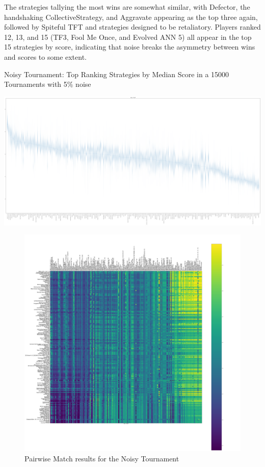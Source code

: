 \documentclass{article}
\begin{document}
The strategies tallying the most wins are somewhat similar, with Defector, the
handshaking CollectiveStrategy, and Aggravate appearing as the top three again,
followed by Spiteful TFT and strategies designed to be retaliatory. Players ranked
12, 13, and 15 (TF3, Fool Me Once, and Evolved ANN 5) all appear in the top 15
strategies by score, indicating that noise breaks the asymmetry between wins
and scores to some extent.


\begin{table}[!hbtp]
    \centering
        
        \caption{Noisy Tournament: Top Ranking Strategies by Median Score in a
        15000 Tournaments with 5\% noise}
        \label{tbl:noisy_score}
\end{table}


\begin{landscape}
    \includegraphics[width=\paperwidth]{plots/Noisy_boxplot.pdf}
\end{landscape}

\begin{figure}[!hbtp]
    \includegraphics[width=\paperwidth]{plots/Noisy_payoff.pdf}
    \caption{Pairwise Match results for the Noisy Tournament}
\end{figure}
\end{document}
